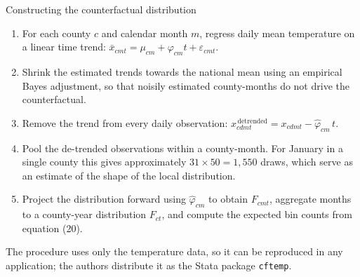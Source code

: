 \documentclass[aspectratio=169,10pt]{beamer}
\begin{document}
\begin{frame}{Constructing the counterfactual distribution}
  \small
  \begin{enumerate}
    \item For each county $c$ and calendar month $m$, regress daily mean temperature
          on a linear time trend:
          $\bar x_{cmt} = \mu_{cm} + \varphi_{cm} t + \varepsilon_{cmt}$.
    \item Shrink the estimated trends towards the national mean using an empirical
          Bayes adjustment, so that noisily estimated county-months do not drive the
          counterfactual.
    \item Remove the trend from every daily observation:
          $x^{\,\text{detrended}}_{cdmt} = x_{cdmt} - \hat\varphi_{cm}\,t$.
    \item Pool the de-trended observations within a county-month. For January in a
          single county this gives approximately $31 \times 50 = 1{,}550$ draws, which
          serve as an estimate of the shape of the local distribution.
    \item Project the distribution forward using $\hat\varphi_{cm}$ to obtain
          $F_{cmt}$, aggregate months to a county-year distribution $F_{ct}$, and
          compute the expected bin counts from equation (20).
  \end{enumerate}
  \vspace{4pt}
  The procedure uses only the temperature data, so it can be reproduced in any
  application; the authors distribute it as the Stata package \texttt{cftemp}.
\end{frame}
\end{document}
